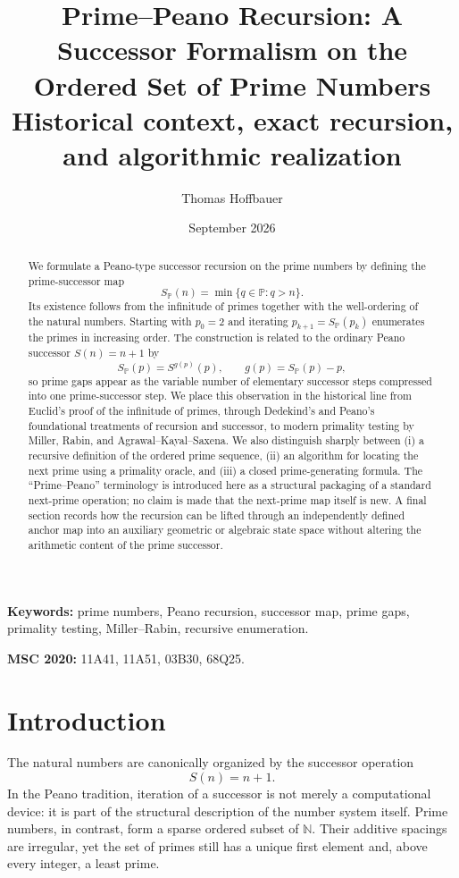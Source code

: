 \documentclass[11pt]{article}
\title{\textbf{Prime--Peano Recursion: A Successor Formalism on the Ordered Set of Prime Numbers}\\[0.35em]
\large Historical context, exact recursion, and algorithmic realization}
\author{Thomas Hoffbauer}
\date{September 2026}
\theoremstyle{definition}
\newcommand{\N}{\mathbb{N}}
\newcommand{\Pp}{\mathbb{P}}
\newcommand{\SP}{S_{\!\Pp}}
\newcommand{\gap}{g}
\begin{document}
\maketitle

\begin{abstract}
We formulate a Peano-type successor recursion on the prime numbers by defining the prime-successor map
\[
\SP(n)=\min\{q\in\Pp:q>n\}.
\]
Its existence follows from the infinitude of primes together with the well-ordering of the natural numbers. Starting with $p_0=2$ and iterating $p_{k+1}=\SP(p_k)$ enumerates the primes in increasing order. The construction is related to the ordinary Peano successor $S(n)=n+1$ by
\[
\SP(p)=S^{\gap(p)}(p),\qquad \gap(p)=\SP(p)-p,
\]
so prime gaps appear as the variable number of elementary successor steps compressed into one prime-successor step. We place this observation in the historical line from Euclid's proof of the infinitude of primes, through Dedekind's and Peano's foundational treatments of recursion and successor, to modern primality testing by Miller, Rabin, and Agrawal--Kayal--Saxena. We also distinguish sharply between (i) a recursive definition of the ordered prime sequence, (ii) an algorithm for locating the next prime using a primality oracle, and (iii) a closed prime-generating formula. The ``Prime--Peano'' terminology is introduced here as a structural packaging of a standard next-prime operation; no claim is made that the next-prime map itself is new. A final section records how the recursion can be lifted through an independently defined anchor map into an auxiliary geometric or algebraic state space without altering the arithmetic content of the prime successor.
\end{abstract}

\textbf{Keywords:} prime numbers, Peano recursion, successor map, prime gaps, primality testing, Miller--Rabin, recursive enumeration.

\textbf{MSC 2020:} 11A41, 11A51, 03B30, 68Q25.

\section{Introduction}

The natural numbers are canonically organized by the successor operation
\[
S(n)=n+1.
\]
In the Peano tradition, iteration of a successor is not merely a computational device: it is part of the structural description of the number system itself. Prime numbers, in contrast, form a sparse ordered subset of $\N$. Their additive spacings are irregular, yet the set of primes still has a unique first element and, above every integer, a least prime.
\end{document}
